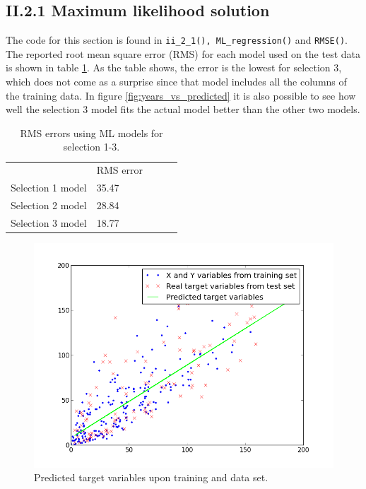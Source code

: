 \documentclass[12pt]{article}
\begin{document}
  \subsection*{II.2.1 Maximum likelihood solution}

    The code for this section is found in \texttt{ii\_2\_1(), ML\_regression()} and \texttt{RMSE()}. The reported root mean square error (RMS) for each model used on the test data is shown in table \ref{table:rms_errors}. As the table shows, the error is the lowest for selection 3, which does not come as a surprise since that model includes all the columns of the training data. In figure \ref{fig:years_vs_predicted} it is also possible to see how well the selection 3 model fits the actual model better than the other two models.

    \begin{table}[h]
      \centering
      \begin{tabular}{l|l|lll}
      \cline{2-2}
                                              & RMS error &  &  &  \\ \cline{1-2}
      \multicolumn{1}{|l|}{Selection 1 model} & 35.47     &  &  &  \\
      \multicolumn{1}{|l|}{Selection 2 model} & 28.84     &  &  &  \\
      \multicolumn{1}{|l|}{Selection 3 model} & 18.77     &  &  &  \\ \cline{1-2}
      \end{tabular}
      \caption{RMS errors using ML models for selection 1-3.}
      \label{table:rms_errors}
    \end{table}

    \begin{figure}[h]
      \centering
        \includegraphics[width=1.0\textwidth]{figures/figure_II_2_1_1}
      \caption{Predicted target variables upon training and data set.}
      \label{fig:target_vars}
    \end{figure}
\end{document}
